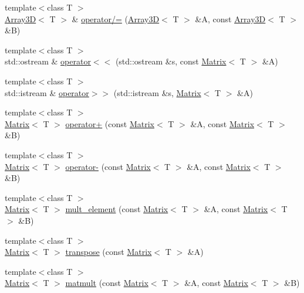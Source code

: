 \begin{DoxyCompactItemize}
\item 
{\footnotesize template$<$class T $>$ }\\\hyperlink{classTNT_1_1Array3D}{Array3\-D}$<$ T $>$ \& \hyperlink{namespaceTNT_adc8dc2db8d115a87af465d1d502bece1}{operator/=} (\hyperlink{classTNT_1_1Array3D}{Array3\-D}$<$ T $>$ \&A, const \hyperlink{classTNT_1_1Array3D}{Array3\-D}$<$ T $>$ \&B)
\item 
{\footnotesize template$<$class T $>$ }\\std\-::ostream \& \hyperlink{namespaceTNT_a35dd0a4b8055b08b5ff492b27691e77e}{operator$<$$<$} (std\-::ostream \&s, const \hyperlink{classTNT_1_1Matrix}{Matrix}$<$ T $>$ \&A)
\item 
{\footnotesize template$<$class T $>$ }\\std\-::istream \& \hyperlink{namespaceTNT_a7b2afad2ac4a2fba0673ddd9f95a8cb6}{operator$>$$>$} (std\-::istream \&s, \hyperlink{classTNT_1_1Matrix}{Matrix}$<$ T $>$ \&A)
\item 
{\footnotesize template$<$class T $>$ }\\\hyperlink{classTNT_1_1Matrix}{Matrix}$<$ T $>$ \hyperlink{namespaceTNT_aac8c4cff00d07216b49f509ca2ba5833}{operator+} (const \hyperlink{classTNT_1_1Matrix}{Matrix}$<$ T $>$ \&A, const \hyperlink{classTNT_1_1Matrix}{Matrix}$<$ T $>$ \&B)
\item 
{\footnotesize template$<$class T $>$ }\\\hyperlink{classTNT_1_1Matrix}{Matrix}$<$ T $>$ \hyperlink{namespaceTNT_ad00860a15fba14ffc48b8a3c620aee8f}{operator-\/} (const \hyperlink{classTNT_1_1Matrix}{Matrix}$<$ T $>$ \&A, const \hyperlink{classTNT_1_1Matrix}{Matrix}$<$ T $>$ \&B)
\item 
{\footnotesize template$<$class T $>$ }\\\hyperlink{classTNT_1_1Matrix}{Matrix}$<$ T $>$ \hyperlink{namespaceTNT_a008b866b3938af612e303fa477b844bc}{mult\-\_\-element} (const \hyperlink{classTNT_1_1Matrix}{Matrix}$<$ T $>$ \&A, const \hyperlink{classTNT_1_1Matrix}{Matrix}$<$ T $>$ \&B)
\item 
{\footnotesize template$<$class T $>$ }\\\hyperlink{classTNT_1_1Matrix}{Matrix}$<$ T $>$ \hyperlink{namespaceTNT_ab22c518de961e96e4a654ce4b4c6b948}{transpose} (const \hyperlink{classTNT_1_1Matrix}{Matrix}$<$ T $>$ \&A)
\item 
{\footnotesize template$<$class T $>$ }\\\hyperlink{classTNT_1_1Matrix}{Matrix}$<$ T $>$ \hyperlink{namespaceTNT_a53e97abb43a5114bbcdc7d2687b19349}{matmult} (const \hyperlink{classTNT_1_1Matrix}{Matrix}$<$ T $>$ \&A, const \hyperlink{classTNT_1_1Matrix}{Matrix}$<$ T $>$ \&B)

\end{DoxyCompactItemize}
